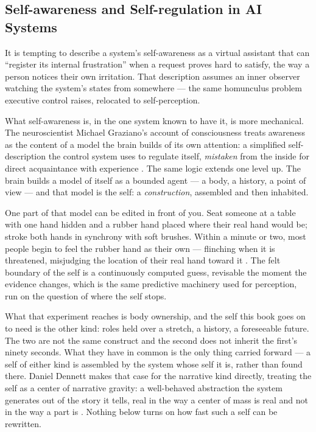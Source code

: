 \subsection{Self-awareness and Self-regulation in AI Systems}
\label{sec:2.2.1}
It is tempting to describe a system's self-awareness as a virtual assistant that can “register its internal frustration” when a request proves hard to satisfy, the way a person notices their own irritation. That description assumes an inner observer watching the system's states from somewhere — the same homunculus problem executive control raises, relocated to self-perception.

What self-awareness is, in the one system known to have it, is more mechanical. The neuroscientist Michael Graziano's account of consciousness treats awareness as the content of a model the brain builds of its own attention: a simplified self-description the control system uses to regulate itself, \emph{mistaken} from the inside for direct acquaintance with experience \autocite{graziano2013consciousness}. The same logic extends one level up. The brain builds a model of itself as a bounded agent — a body, a history, a point of view — and that model is the self: a \emph{construction}, assembled and then inhabited.

One part of that model can be edited in front of you. Seat someone at a table with one hand hidden and a rubber hand placed where their real hand would be; stroke both hands in synchrony with soft brushes. Within a minute or two, most people begin to feel the rubber hand as their own — flinching when it is threatened, misjudging the location of their real hand toward it \autocite{botvinick1998rubber}. The felt boundary of the self is a continuously computed guess, revisable the moment the evidence changes, which is the same predictive machinery used for perception, run on the question of where the self stops.

What that experiment reaches is body ownership, and the self this book goes on to need is the other kind: roles held over a stretch, a history, a foreseeable future. The two are not the same construct and the second does not inherit the first's ninety seconds. What they have in common is the only thing carried forward — a self of either kind is assembled by the system whose self it is, rather than found there. Daniel Dennett makes that case for the narrative kind directly, treating the self as a center of narrative gravity: a well-behaved abstraction the system generates out of the story it tells, real in the way a center of mass is real and not in the way a part is \autocite{dennett1992narrative}. Nothing below turns on how fast such a self can be rewritten.

